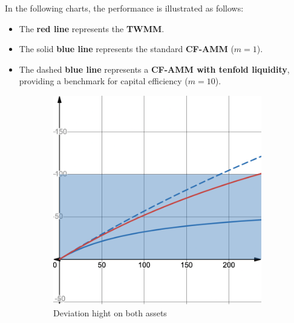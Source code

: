 In the following charts, the performance is illustrated as follows:
\begin{itemize}
	\item The \textbf{red line} represents the \textbf{TWMM}.
	\item The solid \textbf{blue line} represents the standard \textbf{CF-AMM} ($m=1$).
	\item The dashed \textbf{blue line} represents a \textbf{CF-AMM with tenfold liquidity}, providing a benchmark for capital efficiency ($m=10$).
\end{itemize}
\begin{figure}[h!]
	\centering
	\begin{subfigure}{0.4\textwidth} %
		\centering
		\includegraphics[width=\linewidth]{comparing_with_cfamm_deviation_big.png} %
		\caption{Deviation hight on both assets}
		\label{fig:img4}
	\end{subfigure}
	\hfill %
	\begin{subfigure}{0.4\textwidth}
		\centering

\end{subfigure}
\end{figure}
